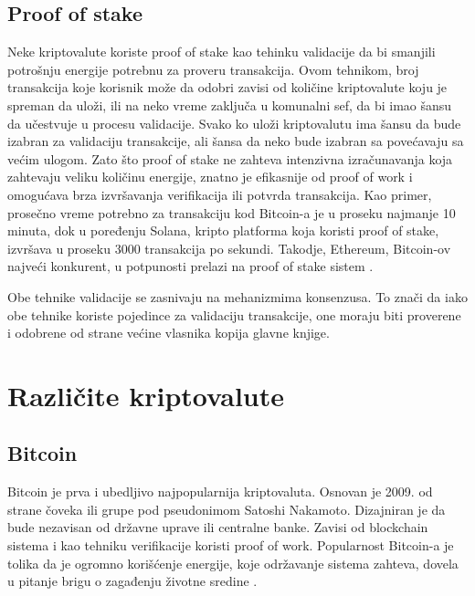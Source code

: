 \documentclass[a4paper]{article}
\begin{document}
{\subsection{Proof of stake}
\label{subsec:stake}
Neke kriptovalute koriste proof of stake kao tehinku validacije da bi smanjili potrošnju energije potrebnu za proveru transakcija. Ovom tehnikom, broj transakcija koje korisnik može da odobri zavisi od količine kriptovalute koju je spreman da uloži, ili na neko vreme zaključa u komunalni sef, da bi imao šansu da učestvuje u procesu validacije.
Svako ko uloži kriptovalutu ima šansu da bude izabran za validaciju transakcije, ali šansa da neko bude izabran sa povećavaju sa većim ulogom.
Zato što proof of stake ne zahteva intenzivna izračunavanja koja zahtevaju veliku količinu energije, znatno je efikasnije od proof of work i omogućava brza izvršavanja verifikacija ili potvrda transakcija.
Kao primer, prosečno vreme potrebno za transakciju kod Bitcoin-a je u proseku najmanje 10 minuta, dok u poređenju Solana, kripto platforma koja koristi proof of stake, izvršava u proseku 3000 transakcija po sekundi.
Takodje, Ethereum, Bitcoin-ov najveći konkurent, u potpunosti prelazi na proof of stake sistem \cite{kriptovalute2}.

Obe tehnike validacije se zasnivaju na mehanizmima konsenzusa. To znači da iako obe tehnike koriste pojedince za validaciju transakcije, one moraju biti proverene i odobrene od strane većine vlasnika kopija glavne knjige.\cite{kriptovalute2}


\section{Različite kriptovalute}
\label{sec:različitekriptovalute}

\subsection{Bitcoin}
\label{subsec:bitcoin}
Bitcoin je prva i ubedljivo najpopularnija kriptovaluta. Osnovan je 2009. od strane čoveka ili grupe pod pseudonimom Satoshi Nakamoto. Dizajniran je da bude nezavisan od državne uprave ili centralne banke. Zavisi od blockchain sistema i kao tehniku verifikacije koristi proof of work. Popularnost Bitcoin-a je tolika da je ogromno korišćenje energije, koje održavanje sistema zahteva, dovela u pitanje brigu o zagađenju životne sredine \cite{različitekriptovalute}.

}
\end{document}
